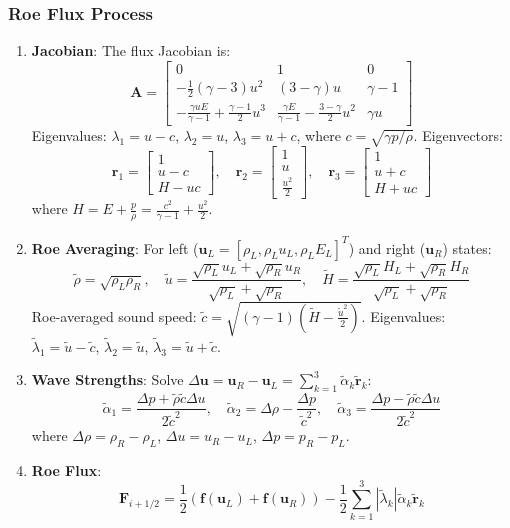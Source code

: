 \documentclass[12pt]{article}
\begin{document}
\subsubsection*{Roe Flux Process}
\begin{enumerate}
    \item \textbf{Jacobian}: The flux Jacobian is:
    \[
    \mathbf{A} = \begin{bmatrix}
    0 & 1 & 0 \\
    -\frac{1}{2}(\gamma-3)u^2 & (3-\gamma)u & \gamma-1 \\
    -\frac{\gamma u E}{\gamma-1} + \frac{\gamma-1}{2}u^3 & \frac{\gamma E}{\gamma-1} - \frac{3-\gamma}{2}u^2 & \gamma u
    \end{bmatrix}
    \]
    Eigenvalues: \(\lambda_1 = u - c\), \(\lambda_2 = u\), \(\lambda_3 = u + c\), where \(c = \sqrt{\gamma p / \rho}\). Eigenvectors:
    \[
    \mathbf{r}_1 = \begin{bmatrix} 1 \\ u - c \\ H - u c \end{bmatrix}, \quad \mathbf{r}_2 = \begin{bmatrix} 1 \\ u \\ \frac{u^2}{2} \end{bmatrix}, \quad \mathbf{r}_3 = \begin{bmatrix} 1 \\ u + c \\ H + u c \end{bmatrix}
    \]
    where \(H = E + \frac{p}{\rho} = \frac{c^2}{\gamma-1} + \frac{u^2}{2}\).

    \item \textbf{Roe Averaging}: For left (\(\mathbf{u}_L = [\rho_L, \rho_L u_L, \rho_L E_L]^T\)) and right (\(\mathbf{u}_R\)) states:
    \[
    \tilde{\rho} = \sqrt{\rho_L \rho_R}, \quad \tilde{u} = \frac{\sqrt{\rho_L} u_L + \sqrt{\rho_R} u_R}{\sqrt{\rho_L} + \sqrt{\rho_R}}, \quad \tilde{H} = \frac{\sqrt{\rho_L} H_L + \sqrt{\rho_R} H_R}{\sqrt{\rho_L} + \sqrt{\rho_R}}
    \]
    Roe-averaged sound speed: \(\tilde{c} = \sqrt{(\gamma-1)\left(\tilde{H} - \frac{\tilde{u}^2}{2}\right)}\). Eigenvalues: \(\tilde{\lambda}_1 = \tilde{u} - \tilde{c}\), \(\tilde{\lambda}_2 = \tilde{u}\), \(\tilde{\lambda}_3 = \tilde{u} + \tilde{c}\).

    \item \textbf{Wave Strengths}: Solve \(\Delta \mathbf{u} = \mathbf{u}_R - \mathbf{u}_L = \sum_{k=1}^3 \tilde{\alpha}_k \tilde{\mathbf{r}}_k\):
    \[
    \tilde{\alpha}_1 = \frac{\Delta p + \tilde{\rho} \tilde{c} \Delta u}{2 \tilde{c}^2}, \quad \tilde{\alpha}_2 = \Delta \rho - \frac{\Delta p}{\tilde{c}^2}, \quad \tilde{\alpha}_3 = \frac{\Delta p - \tilde{\rho} \tilde{c} \Delta u}{2 \tilde{c}^2}
    \]
    where \(\Delta \rho = \rho_R - \rho_L\), \(\Delta u = u_R - u_L\), \(\Delta p = p_R - p_L\).

    \item \textbf{Roe Flux}:
    \[
    \mathbf{F}_{i+1/2} = \frac{1}{2} \left( \mathbf{f}(\mathbf{u}_L) + \mathbf{f}(\mathbf{u}_R) \right) - \frac{1}{2} \sum_{k=1}^3 |\tilde{\lambda}_k| \tilde{\alpha}_k \tilde{\mathbf{r}}_k
    \]
\end{enumerate}
\end{document}
